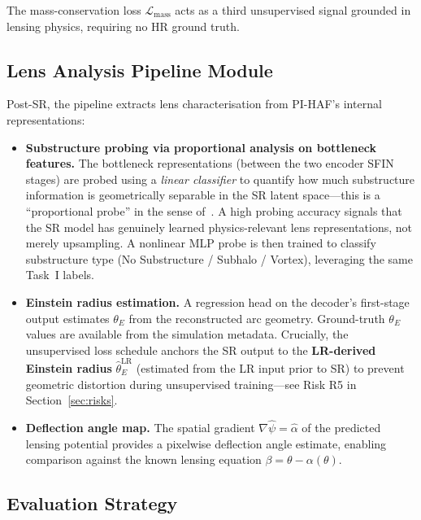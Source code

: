 \documentclass[11pt,a4paper]{article}
\newcommand{\Lmass}{\mathcal{L}_{\text{mass}}}
\begin{document}
The mass-conservation loss $\Lmass$ acts as a third unsupervised signal grounded in lensing physics, requiring no HR ground truth.

\subsection{Lens Analysis Pipeline Module}

Post-SR, the pipeline extracts lens characterisation from PI-HAF's internal representations:

\begin{itemize}
  \item \textbf{Substructure probing via proportional analysis on bottleneck features.} The bottleneck representations (between the two encoder SFIN stages) are probed using a \emph{linear classifier} to quantify how much substructure information is geometrically separable in the SR latent space---this is a ``proportional probe'' in the sense of~\citep{alain2017}. A high probing accuracy signals that the SR model has genuinely learned physics-relevant lens representations, not merely upsampling. A nonlinear MLP probe is then trained to classify substructure type (No Substructure / Subhalo / Vortex), leveraging the same Task~I labels.

  \item \textbf{Einstein radius estimation.} A regression head on the decoder's first-stage output estimates $\theta_E$ from the reconstructed arc geometry. Ground-truth $\theta_E$ values are available from the simulation metadata. Crucially, the unsupervised loss schedule anchors the SR output to the \textbf{LR-derived Einstein radius} $\hat{\theta}_E^{\text{LR}}$ (estimated from the LR input prior to SR) to prevent geometric distortion during unsupervised training---see Risk R5 in Section~\ref{sec:risks}.

  \item \textbf{Deflection angle map.} The spatial gradient $\nabla\hat{\psi} = \hat{\alpha}$ of the predicted lensing potential provides a pixelwise deflection angle estimate, enabling comparison against the known lensing equation $\beta = \theta - \alpha(\theta)$.
\end{itemize}

\subsection{Evaluation Strategy}
\end{document}
